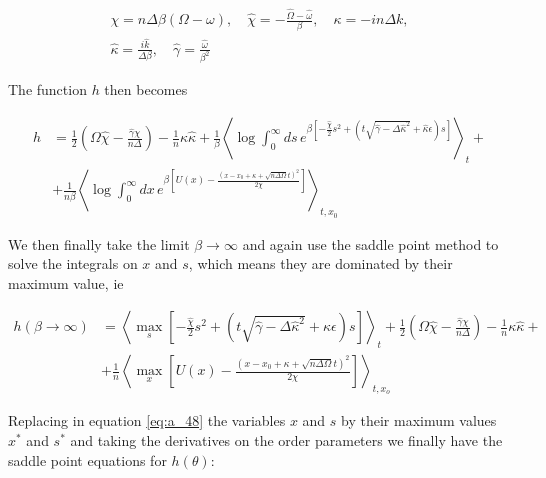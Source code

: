 \begin{align}
  \label{eq:a_anzats}
  \chi = n \Delta \beta (\Omega - \omega), \quad \hat{\chi} = -\frac{\hat{\Omega} - \hat{\omega}}{\beta}, \quad \kappa = -in\Delta k, \\
  \hat{\kappa} = \frac{i\hat{k}}{\Delta \beta}, \quad \hat{\gamma} = \frac{\hat{\omega}}{\beta^2}
\end{align}

The function $h$ then becomes

\begin{align}
  \label{eq:a_h}
  h &= \frac{1}{2} \left(\Omega \hat{\chi} - \frac{\hat{\gamma}
      \chi}{n \Delta} \right) - \frac{1}{n} \kappa \hat{\kappa} +
  \frac{1}{\beta} \left\langle \log \int_0^\infty ds \,
  e^{\beta \left[-\frac{\hat{\chi}}{2}s^2 + (t \sqrt{\hat{\gamma} - \Delta
      \hat{\kappa}^2} + \hat{\kappa}\epsilon) s\right]}
\right\rangle_t + \nonumber \\ &+
\frac{1}{n\beta}\left\langle \log \int_0^\infty dx \, e^{\beta \left[ U(x) - \frac{(x - x_0 + \kappa +
      \sqrt{n\Delta\Omega}t)^2}{2\chi}\right]} \right\rangle_{t,x_0}
\end{align}

We then finally take the limit $\beta \to \infty$ and again use the saddle point method to solve the integrals on $x$ and $s$, which means they are dominated by their maximum value, ie 

\begin{align}
  \label{eq:a_48}
  h(\beta \to \infty)& = \left\langle \max_s \left[-\frac{\hat{\chi}}{2}s^2 + (t \sqrt{\hat{\gamma} - \Delta
      \hat{\kappa}^2} + \hat{\kappa}\epsilon) s\right] \right\rangle_t +
  \frac{1}{2} \left(\Omega \hat{\chi} - \frac{\hat{\gamma}
      \chi}{n\Delta}\right) - \frac{1}{n} \kappa \hat{\kappa} + \nonumber\\ &+
  \frac{1}{n} \left\langle \max_x \left[U(x) - \frac{(x - x_0 + \kappa +
      \sqrt{n\Delta\Omega}t)^2}{2\chi}\right] \right\rangle_{t,x_o}
\end{align}

Replacing in equation \eqref{eq:a_48} the variables $x$ and $s$ by their maximum values $x^\ast$ and $s^\ast$ and taking the derivatives on the order parameters we finally have the saddle point equations for $h(\theta)$:

